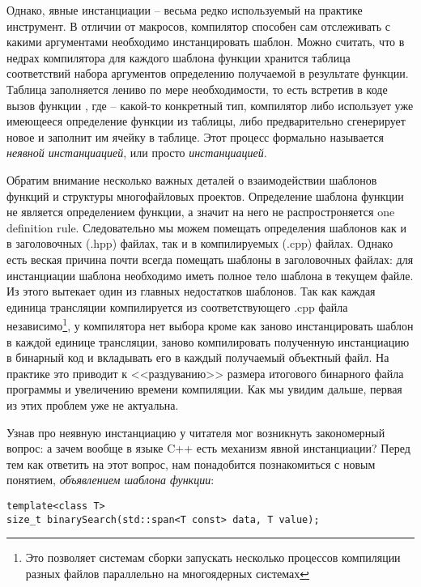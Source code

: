 Однако, явные инстанциации -- весьма редко используемый на практике инструмент. В отличии от макросов, компилятор способен сам отслеживать с какими аргументами необходимо инстанцировать шаблон. Можно считать, что в недрах компилятора для каждого шаблона функции хранится таблица соответствий набора аргументов определению получаемой в результате функции. Таблица заполняется лениво по мере необходимости, то есть встретив в коде вызов функции , где  -- какой-то конкретный тип, компилятор либо использует уже имеющееся определение функции из таблицы, либо предварительно сгенерирует новое и заполнит им ячейку в таблице. Этот процесс формально называется \textit{неявной инстанциацией}, или просто \textit{инстанциацией}.

Обратим внимание несколько важных деталей о взаимодействии шаблонов функций и структуры многофайловых проектов. Определение шаблона функции не является определением функции, а значит на него не распростроняется one definition rule. Следовательно мы можем помещать определения шаблонов как и в заголовочных (.hpp) файлах, так и в компилируемых (.cpp) файлах. Однако есть веская причина почти всегда помещать шаблоны в заголовочных файлах: для инстанциации шаблона необходимо иметь полное тело шаблона в текущем файле. Из этого вытекает один из главных недостатков шаблонов. Так как каждая единица трансляции компилируется из соответствующего .cpp файла независимо\footnote{Это позволяет системам сборки запускать несколько процессов компиляции разных файлов параллельно на многоядерных системах}, у компилятора нет выбора кроме как заново инстанцировать шаблон в каждой единице трансляции, заново компилировать полученную инстанциацию в бинарный код и вкладывать его в каждый получаемый объектный файл. На практике это приводит к <<раздуванию>> размера итогового бинарного файла программы и увеличению времени компиляции. Как мы увидим дальше, первая из этих проблем уже не актуальна.

Узнав про неявную инстанциацию у читателя мог возникнуть закономерный вопрос: а зачем вообще в языке C++ есть механизм явной инстанциации? Перед тем как ответить на этот вопрос, нам понадобится познакомиться с новым понятием, \textit{объявлением шаблона функции}:
\begin{verbatim}
template<class T>
size_t binarySearch(std::span<T const> data, T value);
\end{verbatim}
